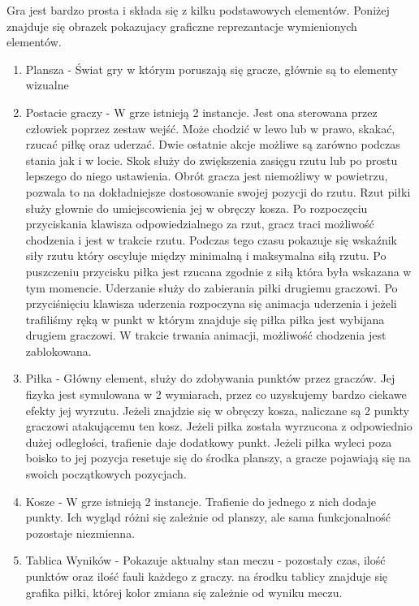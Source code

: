\documentclass[a4paper,12pt,twoside,openany]{report}
\begin{document}
Gra jest bardzo prosta i składa się z kilku podstawowych elementów.
Poniżej znajduje się obrazek pokazujacy graficzne reprezantacje wymienionych elementów.
\begin{enumerate}
    \item Plansza - Świat gry w którym poruszają się gracze, głównie są to elementy wizualne
    \item Postacie graczy - W grze istnieją 2 instancje. Jest ona sterowana przez człowiek poprzez zestaw wejść. Może chodzić w lewo lub w prawo, skakać, rzucać piłkę oraz uderzać. Dwie ostatnie akcje możliwe są zarówno podczas stania jak i w locie. Skok służy do zwiększenia zasięgu rzutu lub po prostu lepszego do niego ustawienia. Obrót gracza jest niemożliwy w powietrzu, pozwala to na dokładniejsze dostosowanie swojej pozycji do rzutu. Rzut piłki służy głownie do umiejscowienia jej w obręczy kosza. Po rozpoczęciu przyciskania klawisza odpowiedzialnego za rzut, gracz traci możliwość chodzenia i jest w trakcie rzutu. Podczas tego czasu pokazuje się wskaźnik siły rzutu który oscyluje między minimalną i maksymalna siłą rzutu. Po puszczeniu przycisku piłka jest rzucana zgodnie z siłą która była wskazana w tym momencie. Uderzanie służy do zabierania piłki drugiemu graczowi. Po przyciśnięciu klawisza uderzenia rozpoczyna się animacja uderzenia i jeżeli trafiliśmy ręką w punkt w którym znajduje się piłka piłka jest wybijana drugiem graczowi. W trakcie trwania animacji, możliwość chodzenia jest zablokowana.
    \item Piłka - Główny element, służy do zdobywania punktów przez graczów. Jej fizyka jest symulowana w 2 wymiarach, przez co uzyskujemy bardzo ciekawe efekty jej wyrzutu. Jeżeli znajdzie się w obręczy kosza, naliczane są 2 punkty graczowi atakującemu ten kosz. Jeżeli piłka została wyrzucona z odpowiednio dużej odległości, trafienie daje dodatkowy punkt. Jeżeli piłka wyleci poza boisko to jej pozycja resetuje się do środka planszy, a gracze pojawiają się na swoich początkowych pozycjach.
    \item Kosze -  W grze istnieją 2 instancje. Trafienie do jednego z nich dodaje punkty. Ich wygląd różni się zależnie od planszy, ale sama funkcjonalność pozostaje niezmienna.
    \item Tablica Wyników - Pokazuje aktualny stan meczu - pozostały czas, ilość punktów oraz ilość fauli każdego z graczy. na środku tablicy znajduje się grafika piłki, której kolor zmiana się zależnie od wyniku meczu.
\end{enumerate}
\end{document}
